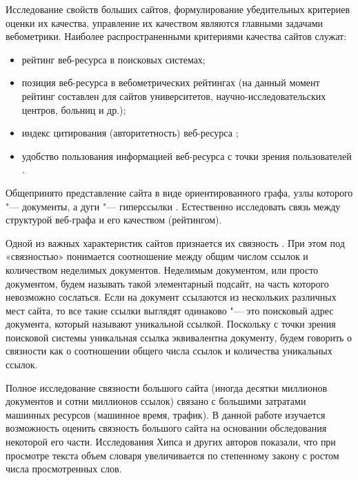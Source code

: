 Исследование свойств больших сайтов, формулирование убедительных критериев оценки их качества, управление их качеством являются главными задачами вебометрики. Наиболее распространенными критериями качества сайтов служат:
\begin{itemize}
	\item рейтинг веб-ресурса в поисковых системах;
	\item позиция веб-ресурса в вебометрических рейтингах \cite{RankingWeb} (на данный момент рейтинг составлен для сайтов университетов, научно-исследовательских центров, больниц и др.);
	\item индекс цитирования (авторитетность) веб-ресурса \cite{ThelwallZuccala,Smith,Nicolaisen,OrtegaAguilloCothey};
	\item удобство пользования информацией веб-ресурса с точки зрения пользователей
	\cite{ChevalierDommesMartins,HarperChen,ZengProctorSalvendy,HuntingtonNicholasJamali}.
\end{itemize}

Общепринято представление сайта в виде ориентированного графа, узлы которого "--- документы, а дуги "--- гиперссылки \cite{BroderKumarMaghoul}. Естественно исследовать связь между структурой веб-графа и его качеством (рейтингом).

Одной из важных характеристик сайтов признается их связность \cite{Thelwall,ThelwallWilkinsonMusgrove}. При этом под «связностью» понимается соотношение между общим числом ссылок и количеством неделимых документов. Неделимым документом, или просто документом, будем называть такой элементарный подсайт, на часть которого невозможно сослаться. Если на документ ссылаются из нескольких различных мест сайта, то все такие ссылки выглядят одинаково "--- это поисковый адрес документа, который называют уникальной ссылкой. Поскольку с точки зрения поисковой системы уникальная ссылка эквивалентна документу, будем говорить о связности как о соотношении общего числа ссылок и количества уникальных ссылок.

Полное исследование связности большого сайта (иногда десятки миллионов документов и сотни миллионов ссылок) связано с большими затратами машинных ресурсов (машинное время, трафик). В данной работе изучается возможность оценить связность большого сайта на основании обследования некоторой его части. Исследования Хипса \cite{Heaps} и других авторов \cite{GelbukhSidorov,Zhang,KuboSatoMatsubara} показали, что при просмотре текста объем словаря увеличивается по степенному закону с ростом числа просмотренных слов.

